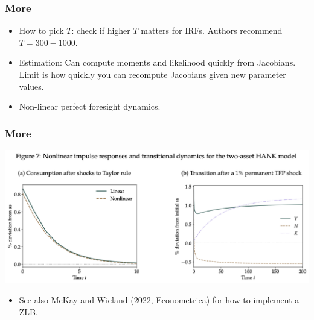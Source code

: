 \documentclass[english,xcolor=svgnames]{beamer}
\begin{document}
\begin{frame}
    \frametitle{More}
    \begin{itemize}
    	\item How to pick $T$: check if higher $T$ matters for IRFs. Authors recommend $T=300-1000$.
    	\item Estimation:  Can compute moments and likelihood quickly from Jacobians. Limit is how quickly you can recompute Jacobians given new parameter values.   	
    	\item Non-linear perfect foresight dynamics.
	\end{itemize}
\end{frame}

\begin{frame}
    \frametitle{More}
    \begin{center}
    	\includegraphics[scale=0.4]{figures/ABRSFIG7.png}
    \end{center}
    \begin{itemize}
    	\item See also McKay and Wieland (2022, Econometrica) for how to implement a ZLB.
    \end{itemize}
\end{frame}
\end{document}
